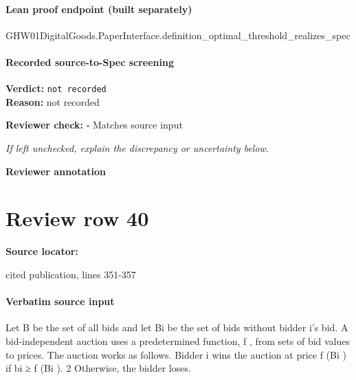 \documentclass[10pt]{article}
\newcommand{\reviewerbox}{%
  \par\noindent\fbox{\parbox{0.96\linewidth}{\rule{0pt}{0.38in}}}\par
}
\newcommand{\reviewmatch}[1]{%
  \par\noindent\textbf{Reviewer check:} $\square$\; #1\par
  \noindent\emph{If left unchecked, explain the discrepancy or uncertainty below.}\par
}
\begin{document}
\paragraph{Lean proof endpoint (built separately)}\begin{ReviewVerbatim}
GHW01DigitalGoods.PaperInterface.definition_optimal_threshold_realizes_spec
\end{ReviewVerbatim}

\paragraph{Recorded source-to-Spec screening}
\textbf{Verdict:} \texttt{not recorded}
\\
\textbf{Reason:} not recorded
\reviewmatch{Matches source input}
\noindent\textbf{Reviewer annotation}\par
\reviewerbox
\clearpage
\hypertarget{source-claim-358ff71fbc93837d}{}
\section*{Review row 40}
\textbf{Source locator:} {\footnotesize\raggedright cited publication, lines 351-\allowbreak{}357\par}
\paragraph{Verbatim source input}
\begin{ReviewVerbatim}
Let B be the set of all bids and let Bi be the set
of bids without bidder i’s bid. A bid-independent
auction uses a predetermined function, f , from sets
of bid values to prices. The auction works as follows.
Bidder i wins the auction at price f (Bi ) if bi ≥ f (Bi ).
2
Otherwise, the bidder loses.
\end{ReviewVerbatim}
\end{document}
